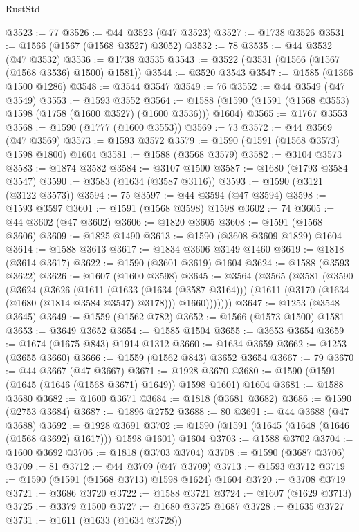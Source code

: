 \begin{lexlean}{RustStd}
\begin{coremodule}
@3523 := 77
@3526 := @44 @3523 (@47 @3523)
@3527 := @1738 @3526
@3531 := @1566 (@1567 (@1568 @3527) @3052)
@3532 := 78
@3535 := @44 @3532 (@47 @3532)
@3536 := @1738 @3535
@3543 := @3522 (@3531 (@1566 (@1567 (@1568 @3536) @1500) @1581))
@3544 := @3520 @3543
@3547 := @1585 (@1366 @1500 @1286)
@3548 := @3544 @3547
@3549 := 76
@3552 := @44 @3549 (@47 @3549)
@3553 := @1593 @3552
@3564 := @1588 (@1590 (@1591 (@1568 @3553) @1598 (@1758 (@1600 @3527) (@1600 @3536))) @1604)
@3565 := @1767 @3553
@3568 := @1590 (@1777 (@1600 @3553))
@3569 := 73
@3572 := @44 @3569 (@47 @3569)
@3573 := @1593 @3572
@3579 := @1590 (@1591 (@1568 @3573) @1598 @1800) @1604
@3581 := @1588 (@3568 @3579)
@3582 := @3104 @3573
@3583 := @1874 @3582
@3584 := @3107 @1500
@3587 := @1680 (@1793 @3584 @3547)
@3590 := @3583 (@1634 (@3587 @3116))
@3593 := @1590 (@3121 (@3122 @3573))
@3594 := 75
@3597 := @44 @3594 (@47 @3594)
@3598 := @1593 @3597
@3601 := @1591 (@1568 @3598) @1598
@3602 := 74
@3605 := @44 @3602 (@47 @3602)
@3606 := @1820 @3605
@3608 := @1591 (@1568 @3606)
@3609 := @1825 @1490
@3613 := @1590 (@3608 @3609 @1829) @1604
@3614 := @1588 @3613
@3617 := @1834 @3606 @3149 @1460
@3619 := @1818 (@3614 @3617)
@3622 := @1590 (@3601 @3619) @1604
@3624 := @1588 (@3593 @3622)
@3626 := @1607 (@1600 @3598)
@3645 := @3564
    (@3565
      (@3581
        (@3590
          (@3624
            (@3626
              (@1611
                (@1633 (@1634 (@3587 @3164)))
                (@1611 (@3170 (@1634 (@1680 (@1814 @3584 @3547) @3178))) @1660)))))))
@3647 := @1253 (@3548 @3645)
@3649 := @1559 (@1562 @782)
@3652 := @1566 (@1573 @1500) @1581
@3653 := @3649 @3652
@3654 := @1585 @1504
@3655 := @3653 @3654
@3659 := @1674 (@1675 @843) @1914 @1312
@3660 := @1634 @3659
@3662 := @1253 (@3655 @3660)
@3666 := @1559 (@1562 @843) @3652 @3654
@3667 := 79
@3670 := @44 @3667 (@47 @3667)
@3671 := @1928 @3670
@3680 := @1590 (@1591 (@1645 (@1646 (@1568 @3671) @1649)) @1598 @1601) @1604
@3681 := @1588 @3680
@3682 := @1600 @3671
@3684 := @1818 (@3681 @3682)
@3686 := @1590 (@2753 @3684)
@3687 := @1896 @2752
@3688 := 80
@3691 := @44 @3688 (@47 @3688)
@3692 := @1928 @3691
@3702 := @1590 (@1591 (@1645 (@1648 (@1646 (@1568 @3692) @1617))) @1598 @1601) @1604
@3703 := @1588 @3702
@3704 := @1600 @3692
@3706 := @1818 (@3703 @3704)
@3708 := @1590 (@3687 @3706)
@3709 := 81
@3712 := @44 @3709 (@47 @3709)
@3713 := @1593 @3712
@3719 := @1590 (@1591 (@1568 @3713) @1598 @1624) @1604
@3720 := @3708 @3719
@3721 := @3686 @3720
@3722 := @1588 @3721
@3724 := @1607 (@1629 @3713)
@3725 := @3379 @1500
@3727 := @1680 @3725 @1687
@3728 := @1635 @3727
@3731 := @1611 (@1633 (@1634 @3728))

\end{coremodule}
\end{lexlean}

